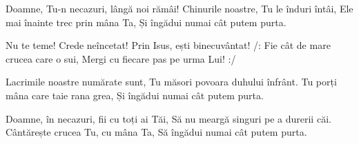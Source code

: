 
\beginverse
Doamne, Tu-n necazuri, lângă noi rămâi!
Chinurile noastre, Tu le înduri întâi,
Ele mai înainte trec prin mâna Ta,
Și îngădui numai cât putem purta.
\endverse

\beginchorus
Nu te teme! Crede neîncetat!
Prin Isus, ești binecuvântat!
/: Fie cât de mare crucea care o sui,
Mergi cu fiecare pas pe urma Lui! :/
\endchorus

\beginverse
Lacrimile noastre numărate sunt,
Tu măsori povoara duhului înfrânt.
Tu porți mâna care taie rana grea,
Și îngădui numai cât putem purta.
\endverse

\beginverse
Doamne, în necazuri, fii cu toți ai Tăi,
Să nu meargă singuri pe a durerii căi.
Cântărește crucea Tu, cu mâna Ta,
Să îngădui numai cât putem purta.
\endverse

\endsong